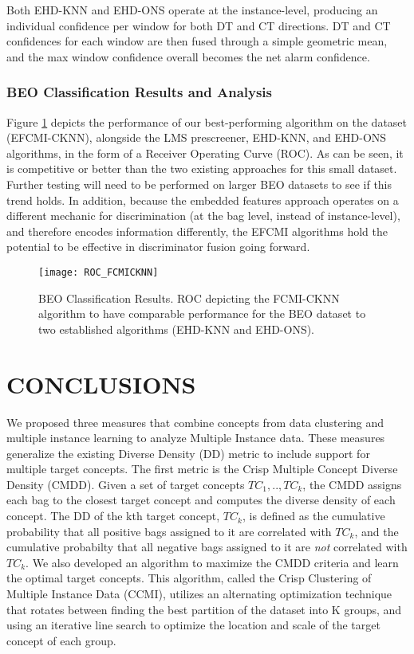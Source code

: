 \documentclass[12pt,dvips]{report}
\numberwithin{equation}{section}
\begin{document}
Both EHD-KNN and EHD-ONS operate at the instance-level, producing an individual confidence per window for both DT and CT directions.  DT and CT confidences for each window are then fused through a simple geometric mean, and the max window confidence overall becomes the net alarm confidence.

\subsection{BEO Classification Results and Analysis} \label{subsec:BEOClassResults}
Figure \ref{fig:ROC_FCMICKNN} depicts the performance of our best-performing algorithm on the dataset (EFCMI-CKNN), alongside the LMS prescreener, EHD-KNN, and EHD-ONS algorithms, in the form of a Receiver Operating Curve (ROC).  As can be seen, it is competitive or better than the two existing approaches for this small dataset.  Further testing will need to be performed on larger BEO datasets to see if this trend holds.  In addition, because the embedded features approach operates on a different mechanic for discrimination (at the bag level, instead of instance-level), and therefore encodes information differently, the EFCMI algorithms hold the potential to be effective in discriminator fusion going forward.

\begin{figure}[htb]\texttt{[image: ROC\_FCMICKNN]}
\caption{BEO Classification Results.  ROC depicting the FCMI-CKNN algorithm to have comparable performance for the BEO dataset to two established algorithms (EHD-KNN and EHD-ONS).}
\label{fig:ROC_FCMICKNN}


\end{figure}


\clearpage

\chapter{CONCLUSIONS} \label{chapter:Conclusions}

We proposed three measures that combine concepts from data clustering and multiple instance learning to analyze Multiple Instance data.  These measures generalize the existing Diverse Density (DD) metric to include support for multiple target concepts.  The first metric is the Crisp Multiple Concept Diverse Density (CMDD).  Given a set of target concepts $TC_{1},..,TC_{k}$, the CMDD assigns each bag to the closest target concept and computes the diverse density of each concept.  The DD of the kth target concept, $TC_{k}$, is defined as the cumulative probability that all positive bags assigned to it are correlated with $TC_{k}$, and the cumulative probabilty that all negative bags assigned to it are \emph{not} correlated with $TC_{k}$. We also developed an algorithm to maximize the CMDD criteria and learn the optimal target concepts.  This algorithm, called the Crisp Clustering of Multiple Instance Data (CCMI), utilizes an alternating optimization technique that rotates between finding the best partition of the dataset into K groups, and using an iterative line search to optimize the location and scale of the target concept of each group.
\end{document}
